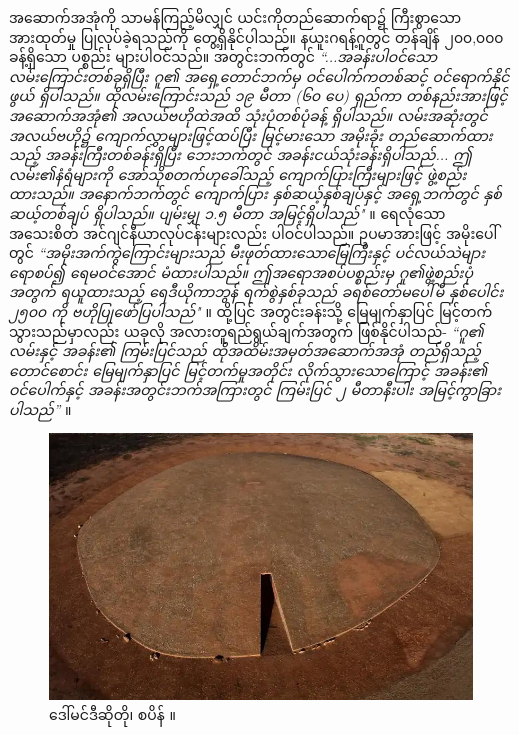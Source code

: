 \documentclass[10pt,twocolumn,letterpaper]{article}
\begin{document}
အဆောက်အအုံကို သာမန်ကြည့်မိလျှင် ယင်းကိုတည်ဆောက်ရာ၌ ကြီးစွာသော အားထုတ်မှု ပြုလုပ်ခဲ့ရသည်ကို တွေ့ရှိနိုင်ပါသည်။ နယူးဂရန့်ဂူတွင် တန်ချိန် ၂၀၀,၀၀၀ ခန့်ရှိသော ပစ္စည်း များပါဝင်သည်။ အတွင်းဘက်တွင် \textit{“...အခန်းပါဝင်သော လမ်းကြောင်းတစ်ခုရှိပြီး ဂူ၏ အရှေ့တောင်ဘက်မှ ဝင်ပေါက်ကတစ်ဆင့် ဝင်ရောက်နိုင်ဖွယ် ရှိပါသည်။ ထိုလမ်းကြောင်းသည် ၁၉ မီတာ (၆၀ ပေ) ရှည်ကာ တစ်နည်းအားဖြင့် အဆောက်အအုံ၏ အလယ်ဗဟိုထဲအထိ သုံးပုံတစ်ပုံခန့် ရှိပါသည်။ လမ်းအဆုံးတွင် အလယ်ဗဟို၌ ကျောက်လွှာများဖြင့်ထပ်ပြီး မြင့်မားသော အမိုးခုံး တည်ဆောက်ထားသည့် အခန်းကြီးတစ်ခန်းရှိပြီး ဘေးဘက်တွင် အခန်းငယ်သုံးခန်းရှိပါသည်... ဤလမ်း၏နံရံများကို အော်သိုစတက်ဟုခေါ်သည့် ကျောက်ပြားကြီးများဖြင့် ဖွဲ့စည်းထားသည်။ အနောက်ဘက်တွင် ကျောက်ပြား နှစ်ဆယ့်နှစ်ချပ်နှင့် အရှေ့ဘက်တွင် နှစ်ဆယ့်တစ်ချပ် ရှိပါသည်။ ပျမ်းမျှ ၁.၅ မီတာ အမြင့်ရှိပါသည်"} \cite{70}။ ရေလုံသော အသေးစိတ် အင်ဂျင်နီယာလုပ်ငန်းများလည်း ပါဝင်ပါသည်။ ဥပမာအားဖြင့် အမိုးပေါ်တွင် \textit{“အမိုးအက်ကွဲကြောင်းများသည် မီးဖုတ်ထားသောမြေကြီးနှင့် ပင်လယ်သဲများ ရောစပ်၍ ရေမဝင်အောင် မံထားပါသည်။ ဤအရောအစပ်ပစ္စည်းမှ ဂူ၏ဖွဲ့စည်းပုံအတွက် ရယူထားသည့် ရေဒီယိုကာဘွန် ရက်စွဲနှစ်ခုသည် ခရစ်တော်မပေါ်မီ နှစ်ပေါင်း ၂၅၀၀ ကို ဗဟိုပြုဖော်ပြပါသည်"} \cite{71}။ ထို့ပြင် အတွင်းခန်းသို့ မြေမျက်နှာပြင် မြင့်တက်သွားသည်မှာလည်း ယခုလို အလားတူရည်ရွယ်ချက်အတွက် ဖြစ်နိုင်ပါသည်- \textit{“ဂူ၏ လမ်းနှင့် အခန်း၏ ကြမ်းပြင်သည် ထိုအထိမ်းအမှတ်အဆောက်အအုံ တည်ရှိသည့် တောင်စောင်း မြေမျက်နှာပြင် မြင့်တက်မှုအတိုင်း လိုက်သွားသောကြောင့် အခန်း၏ ဝင်ပေါက်နှင့် အခန်းအတွင်းဘက်အကြားတွင် ကြမ်းပြင် ၂ မီတာနီးပါး အမြင့်ကွာခြားပါသည်”} \cite{71}။

\begin{figure}[b]
\begin{center}
   \includegraphics[width=1\linewidth]{dolmen.jpg}
\end{center}
   \caption{ဒေါ်မင်ဒီဆိုတို၊ စပိန် \cite{53}။}
\label{fig:9}
\label{fig:onecol}
\end{figure}
\end{document}
